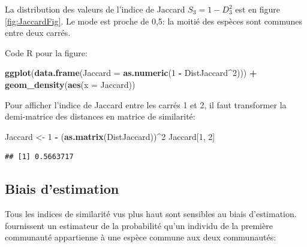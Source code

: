 \documentclass[
  11pt,
  french,
  a4paper,
  extrafontsizes,onecolumn,openright
  ]{memoir}
\newenvironment{Shaded}{\begin{snugshade}}{\end{snugshade}}
\newcommand{\DataTypeTok}[1]{\textcolor[rgb]{0.13,0.29,0.53}{#1}}
\newcommand{\DecValTok}[1]{\textcolor[rgb]{0.00,0.00,0.81}{#1}}
\newcommand{\KeywordTok}[1]{\textcolor[rgb]{0.13,0.29,0.53}{\textbf{#1}}}
\newcommand{\NormalTok}[1]{#1}
\newcommand{\OperatorTok}[1]{\textcolor[rgb]{0.81,0.36,0.00}{\textbf{#1}}}
\newcommand{\StringTok}[1]{\textcolor[rgb]{0.31,0.60,0.02}{#1}}
\begin{document}
\normalsize

La distribution des valeurs de l'indice de Jaccard \(S_3=1-D_3^2\) est en figure \ref{fig:JaccardFig}.
Le mode est proche de 0,5: la moitié des espèces sont communes entre deux carrés.

Code R pour la figure:

\scriptsize

\begin{Shaded}
\begin{Highlighting}[]
\KeywordTok{ggplot}\NormalTok{(}\KeywordTok{data.frame}\NormalTok{(}\DataTypeTok{Jaccard =} \KeywordTok{as.numeric}\NormalTok{(}\DecValTok{1} \OperatorTok{-}\StringTok{ }\NormalTok{DistJaccard}\OperatorTok{^}\DecValTok{2}\NormalTok{))) }\OperatorTok{+}
\StringTok{    }\KeywordTok{geom_density}\NormalTok{(}\KeywordTok{aes}\NormalTok{(}\DataTypeTok{x =}\NormalTok{ Jaccard))}
\end{Highlighting}
\end{Shaded}

\normalsize

Pour afficher l'indice de Jaccard entre les carrés 1 et 2, il faut transformer la demi-matrice des distances en matrice de similarité:

\scriptsize

\begin{Shaded}
\begin{Highlighting}[]
\NormalTok{Jaccard <-}\StringTok{ }\DecValTok{1} \OperatorTok{-}\StringTok{ }\NormalTok{(}\KeywordTok{as.matrix}\NormalTok{(DistJaccard))}\OperatorTok{^}\DecValTok{2}
\NormalTok{Jaccard[}\DecValTok{1}\NormalTok{, }\DecValTok{2}\NormalTok{]}
\end{Highlighting}
\end{Shaded}

\begin{verbatim}
## [1] 0.5663717
\end{verbatim}

\normalsize

\hypertarget{biais-destimation}{%
\subsection{Biais d'estimation}\label{biais-destimation}}

Tous les indices de similarité vus plus haut sont sensibles au biais d'estimation.
\textcite{Chao2004a} fournissent un estimateur de la probabilité qu'un individu de la première communauté appartienne à une espèce commune aux deux communautés:
\end{document}

